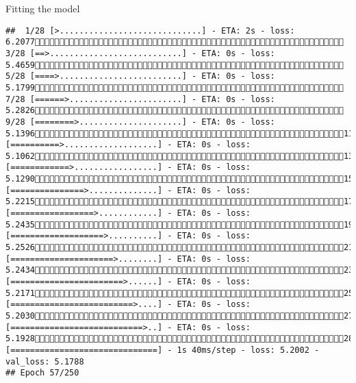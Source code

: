 \documentclass[
  ignorenonframetext,
]{beamer}
\begin{document}
\begin{frame}[fragile]{Fitting the model}
\begin{verbatim}
##  1/28 [>.............................] - ETA: 2s - loss: 6.2077 3/28 [==>...........................] - ETA: 0s - loss: 5.4659 5/28 [====>.........................] - ETA: 0s - loss: 5.1799 7/28 [======>.......................] - ETA: 0s - loss: 5.2826 9/28 [========>.....................] - ETA: 0s - loss: 5.139611/28 [==========>...................] - ETA: 0s - loss: 5.106213/28 [============>.................] - ETA: 0s - loss: 5.129015/28 [===============>..............] - ETA: 0s - loss: 5.221517/28 [=================>............] - ETA: 0s - loss: 5.243519/28 [===================>..........] - ETA: 0s - loss: 5.252621/28 [=====================>........] - ETA: 0s - loss: 5.243423/28 [=======================>......] - ETA: 0s - loss: 5.217125/28 [=========================>....] - ETA: 0s - loss: 5.203027/28 [===========================>..] - ETA: 0s - loss: 5.192828/28 [==============================] - 1s 40ms/step - loss: 5.2002 - val_loss: 5.1788
## Epoch 57/250

\end{verbatim}
\end{frame}
\end{document}
